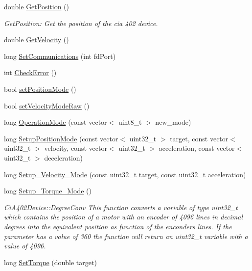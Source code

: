 \begin{DoxyCompactItemize}
double \hyperlink{classCiA402Device_ac8d9e36e6f457565cac7d26d91e4a712}{Get\+Position} ()
\begin{DoxyCompactList}\small\item\em Get\+Position\+: Get the position of the cia 402 device. \end{DoxyCompactList}\item 
double \hyperlink{classCiA402Device_a54b43f6429da4c6c0241653355e81d36}{Get\+Velocity} ()
\item 
long \hyperlink{classCiA402Device_abf511a7d44b62ac93ae18fe21f8d51c9}{Set\+Communications} (int fd\+Port)
\item 
int \hyperlink{classCiA402Device_af1ed15805579e85e514e7ccf4ff21e10}{Check\+Error} ()
\item 
bool \hyperlink{classCiA402Device_a8c09be8df402061e170ca297a7ee6cfe}{set\+Position\+Mode} ()
\item 
bool \hyperlink{classCiA402Device_a4abf9605004db99567ede3370e1d0a4d}{set\+Velocity\+Mode\+Raw} ()
\item 
long \hyperlink{classCiA402Device_a49f298cf0d4d2d68007b3cb396e93a17}{Operation\+Mode} (const vector$<$ uint8\+\_\+t $>$ new\+\_\+mode)
\item 
long \hyperlink{classCiA402Device_abca4743b617d109a915215193bd06fbe}{Setup\+Position\+Mode} (const vector$<$ uint32\+\_\+t $>$ target, const vector$<$ uint32\+\_\+t $>$ velocity, const vector$<$ uint32\+\_\+t $>$ acceleration, const vector$<$ uint32\+\_\+t $>$ deceleration)
\item 
long \hyperlink{classCiA402Device_ac1db22a6a8a7d7a56590423bd7577c7b}{Setup\+\_\+\+Velocity\+\_\+\+Mode} (const uint32\+\_\+t target, const uint32\+\_\+t acceleration)
\item 
long \hyperlink{classCiA402Device_a20475438205c26cd4bcc689ed9c7fe95}{Setup\+\_\+\+Torque\+\_\+\+Mode} ()
\begin{DoxyCompactList}\small\item\em Ci\+A402\+Device\+::\+Degree\+Conv This function converts a variable of type uint32\+\_\+t which contains the position of a motor with an encoder of 4096 lines in decimal degrees into the equivalent position as function of the enconders lines. If the parameter has a value of 360 the function will return an uint32\+\_\+t variable with a value of 4096. \end{DoxyCompactList}\item 
long \hyperlink{classCiA402Device_a556c03984774974dd3a1231793916d9b}{Set\+Torque} (double target)
\item 

\end{DoxyCompactItemize}
